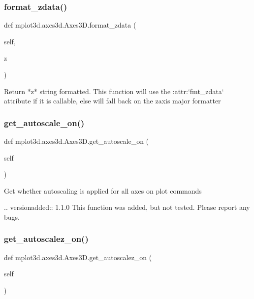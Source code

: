 \subsubsection{\texorpdfstring{format\+\_\+zdata()}{format\_zdata()}}
{\footnotesize\ttfamily def mplot3d.\+axes3d.\+Axes3\+D.\+format\+\_\+zdata (\begin{DoxyParamCaption}\item[{}]{self,  }\item[{}]{z }\end{DoxyParamCaption})}

\begin{DoxyVerb}Return *z* string formatted.  This function will use the
:attr:`fmt_zdata` attribute if it is callable, else will fall
back on the zaxis major formatter
\end{DoxyVerb}
 \mbox{\label{classmplot3d_1_1axes3d_1_1Axes3D_a927b01872fe30d0a1a21412968ee27ff}} 
\subsubsection{\texorpdfstring{get\+\_\+autoscale\+\_\+on()}{get\_autoscale\_on()}}
{\footnotesize\ttfamily def mplot3d.\+axes3d.\+Axes3\+D.\+get\+\_\+autoscale\+\_\+on (\begin{DoxyParamCaption}\item[{}]{self }\end{DoxyParamCaption})}

\begin{DoxyVerb}Get whether autoscaling is applied for all axes on plot commands

.. versionadded:: 1.1.0
    This function was added, but not tested. Please report any bugs.
\end{DoxyVerb}
 \mbox{\label{classmplot3d_1_1axes3d_1_1Axes3D_a9d2207c1791c6b27c4631de27190b2de}} 
\subsubsection{\texorpdfstring{get\+\_\+autoscalez\+\_\+on()}{get\_autoscalez\_on()}}
{\footnotesize\ttfamily def mplot3d.\+axes3d.\+Axes3\+D.\+get\+\_\+autoscalez\+\_\+on (\begin{DoxyParamCaption}\item[{}]{self }\end{DoxyParamCaption})}

